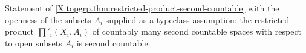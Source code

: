 Statement of \cref{X.topgrp.thm:restricted-product-second-countable} with the openness of the subsets $A_i$ supplied as a typeclass assumption: the restricted product $\prod'_i(X_i,A_i)$ of countably many second countable spaces with respect to open subsets $A_i$ is second countable.
